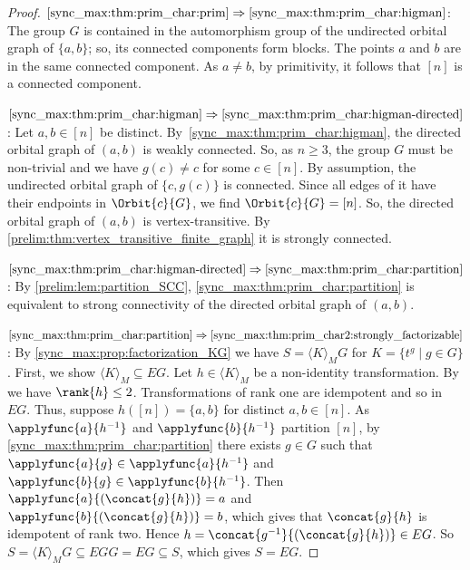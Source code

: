 \begin{proof} 
$\ref{sync_max:thm:prim_char:prim}\Rightarrow \ref{sync_max:thm:prim_char:higman}$: 
The group $G$ is contained in the automorphism group of the undirected orbital graph of $\{a,b\}$;
so, its connected components form blocks. The points $a$ and $b$ are in the same connected component.
As $a \ne b$, by primitivity, it follows that $[n]$ is a connected component.
	
$\ref{sync_max:thm:prim_char:higman}\Rightarrow \ref{sync_max:thm:prim_char:higman-directed}$:
Let $a,b \in [n]$ be distinct.
By~\cref{sync_max:thm:prim_char:higman},
the directed orbital graph of $(a,b)$
is weakly connected. So, as $n \ge 3$, the group $G$ must be non-trivial
and we have $g(c) \ne c$ for some $c \in [n]$.
By assumption, the undirected orbital graph of $\{c,g(c)\}$
is connected. Since all edges of it have their endpoints
in $\Orbit{c}{G}$,
we find $\Orbit{c}{G} = [n]$.
So, the directed orbital graph of $(a,b)$
is vertex-transitive.
By \cref{prelim:thm:vertex_transitive_finite_graph}
it is strongly connected.

$\ref{sync_max:thm:prim_char:higman-directed} \Rightarrow \ref{sync_max:thm:prim_char:partition}$: 
By \cref{prelim:lem:partition_SCC}, \cref{sync_max:thm:prim_char:partition} 
is equivalent to strong connectivity of the directed orbital graph of $(a,b)$.

$\ref{sync_max:thm:prim_char:partition} \Rightarrow \ref{sync_max:thm:prim_char2:strongly_factorizable}$: 
By \cref{sync_max:prop:factorization_KG}
we have $S = \langle K \rangle_M G$ for $K = \{ t^g \mid g \in G\}$.	
First, we show $\langle K \rangle_M \subseteq EG$.
Let $h \in \langle K \rangle_M$ be a non-identity transformation.
By 
we have $\rank{h} \le 2$.
Transformations of rank one are idempotent and so in $EG$.
Thus, suppose $h([n]) = \{a,b\}$ for distinct $a,b \in [n]$.
As $\applyfunc{a}{h^{-1}}$
and $\applyfunc{b}{h^{-1}}$
partition $[n]$, by \cref{sync_max:thm:prim_char:partition} there exists $g \in G$
such that $\applyfunc{a}{g} \in \applyfunc{a}{h^{-1}}$
and $\applyfunc{b}{g} \in \applyfunc{b}{h^{-1}}$.
Then $\applyfunc{a}{(\concat{g}{h})} = a$ 
and $\applyfunc{b}{(\concat{g}{h})} = b$,
which gives that $\concat{g}{h}$ is idempotent of rank two.
Hence $h = \concat{g^{-1}}{(\concat{g}{h})} \in EG$.	
So $S = \langle K \rangle_M G \subseteq EGG = EG \subseteq S$, which gives $S = EG$.


\end{proof}

